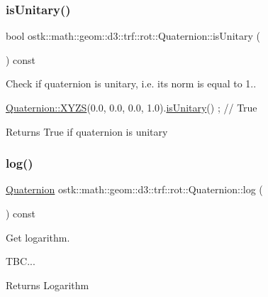 \subsubsection{\texorpdfstring{is\+Unitary()}{isUnitary()}}
{\footnotesize\ttfamily bool ostk\+::math\+::geom\+::d3\+::trf\+::rot\+::\+Quaternion\+::is\+Unitary (\begin{DoxyParamCaption}{ }\end{DoxyParamCaption}) const}



Check if quaternion is unitary, i.\+e. its norm is equal to 1.. 


\begin{DoxyCode}
\hyperlink{classostk_1_1math_1_1geom_1_1d3_1_1trf_1_1rot_1_1_quaternion_ac57ea57a4033622ed1389101b2e58c76}{Quaternion::XYZS}(0.0, 0.0, 0.0, 1.0).\hyperlink{classostk_1_1math_1_1geom_1_1d3_1_1trf_1_1rot_1_1_quaternion_a4e1cafc25046da2cf605694b96066770}{isUnitary}() ; \textcolor{comment}{// True}
\end{DoxyCode}


\begin{DoxyReturn}{Returns}
True if quaternion is unitary 
\end{DoxyReturn}
\mbox{\label{classostk_1_1math_1_1geom_1_1d3_1_1trf_1_1rot_1_1_quaternion_a0ced27267be4ede14ab115f2febc55a3}} 
\subsubsection{\texorpdfstring{log()}{log()}}
{\footnotesize\ttfamily \hyperlink{classostk_1_1math_1_1geom_1_1d3_1_1trf_1_1rot_1_1_quaternion}{Quaternion} ostk\+::math\+::geom\+::d3\+::trf\+::rot\+::\+Quaternion\+::log (\begin{DoxyParamCaption}{ }\end{DoxyParamCaption}) const}



Get logarithm. 


\begin{DoxyCode}
TBC...
\end{DoxyCode}


\begin{DoxyReturn}{Returns}
Logarithm 
\end{DoxyReturn}
\mbox{\label{classostk_1_1math_1_1geom_1_1d3_1_1trf_1_1rot_1_1_quaternion_a34c1237fb6961ff0dc2b7222a3c146f6}} 
